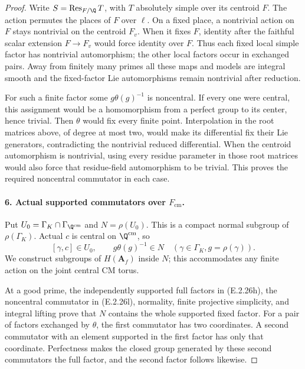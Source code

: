 \begin{proof}
Write \(S=\operatorname{Res}_{F/\Q}T\), with \(T\)
absolutely simple over its centroid \(F\). The action
permutes the places of \(F\) over \(\ell\). On a
fixed place, a nontrivial action on \(F\) stays
nontrivial on the centroid \(F_v\). When it fixes
\(F\), identity after the faithful scalar extension
\(F\to F_v\) would force identity over \(F\).
Thus each fixed local simple factor has nontrivial
automorphism; the other local factors occur in exchanged
pairs. Away from finitely many primes all these maps
and models are integral smooth and the fixed-factor
Lie automorphisms remain nontrivial after reduction.

For such a finite factor some
\(g\theta(g)^{-1}\) is noncentral. If every one were
central, this assignment would be a homomorphism from
a perfect group to its center, hence trivial. Then
\(\theta\) would fix every finite point. Interpolation
in the root matrices above, of degree at most two,
would make its differential fix their Lie generators,
contradicting the nontrivial reduced differential.
When the centroid automorphism is nontrivial, using
every residue parameter in those root matrices
would also force that residue-field automorphism
to be trivial. This proves the required noncentral
commutator in each case.

\paragraph{6. Actual supported commutators over \(F_{\mathrm{cm}}\).}
Put \(U_0=\Gamma_K\cap\Gamma_{\Q^{\mathrm{cm}}}\) and
\(N=\rho(U_0)\). This is a compact normal subgroup
of \(\rho(\Gamma_K)\). Actual \(c\) is central on
\(\Q^{\mathrm{cm}}\), so
\[
 [\gamma,c]\in U_0,
 \qquad g\theta(g)^{-1}\in N
       \quad(\gamma\in\Gamma_K, g=\rho(\gamma)).
 \tag{E.2.26l}
\]
We construct subgroups of \(H(\mathbf A_f)\)
inside \(N\); this accommodates any finite action
on the joint central CM torus.

At a good prime, the independently supported full
factors in (E.2.26h), the noncentral commutator in
(E.2.26l), normality, finite projective simplicity,
and integral lifting prove that \(N\) contains
the whole supported fixed factor. For a pair of
factors exchanged by \(\theta\), the first
commutator has two coordinates. A second commutator
with an element supported in the first factor has
only that coordinate. Perfectness makes the closed
group generated by these second commutators the
full factor, and the second factor follows likewise.


\end{proof}

